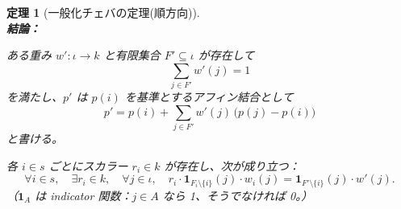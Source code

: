 \documentclass[a4paper,12pt]{bxjsbook}
\theoremstyle{theorem}
\newtheorem{theorem}{定理}[chapter]
\begin{document}
\begin{theorem}[一般化チェバの定理(順方向)]
        \noindent\textbf{\\結論：}\par
        \begin{theoremenumerate}[label=(C\arabic*), leftmargin=4em, topsep=2pt, partopsep=0pt, itemsep=0pt, parsep=0pt]
            \item ある重み $w' : \iota \to k$ と有限集合 $F' \subseteq \iota$ が存在して
            \[
            \sum_{j \in F'} w'(j) = 1
            \]
            を満たし、$p'$ は $p(i)$ を基準とするアフィン結合として
            \[
            p' = p(i) + \sum_{j \in F'} w'(j)\,\bigl(p(j) - p(i)\bigr)
            \]
            と書ける。
            \item 各 $i \in s$ ごとにスカラー $r_i \in k$ が存在し、次が成り立つ：
            \[
                \forall i \in s, \quad \exists r_i \in k, \quad \forall j \in \iota, \quad r_i \cdot \mathbf{1}_{F_i \setminus \{i\}}(j) \cdot w_i(j) = \mathbf{1}_{F' \setminus \{i\}}(j) \cdot w'(j).
            \]
            （$\mathbf{1}_A$ は indicator 関数：$j \in A$ なら 1、そうでなければ 0。）
        \end{theoremenumerate}
    \end{theorem}

\end{document}
